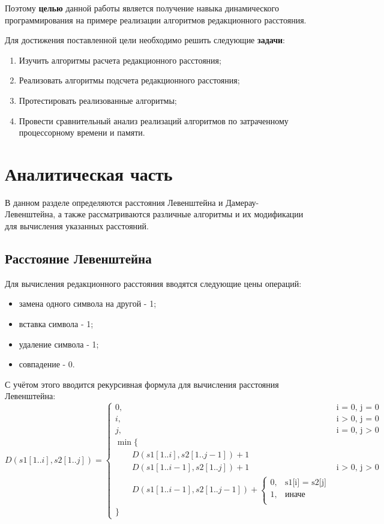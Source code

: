 \documentclass{report}
\begin{document}
Поэтому \textbf{целью} данной работы является получение навыка динамического программирования на примере реализации алгоритмов редакционного расстояния. 

Для достижения поставленной цели необходимо решить следующие \textbf{задачи}:
\begin{enumerate}
\item Изучить алгоритмы расчета редакционного расстояния;
\item Реализовать алгоритмы подсчета редакционного расстояния;
\item Протестировать реализованные алгоритмы;
\item Провести сравнительный анализ реализаций алгоритмов по затраченному процессорному времени и памяти.
\end{enumerate}


\chapter{Аналитическая часть}
В данном разделе определяются расстояния Левенштейна и Дамерау-Левенштейна, а также рассматриваются различные алгоритмы и их модификации для вычисления указанных расстояний.

\section{Расстояние Левенштейна}

Для вычисления редакционного расстояния вводятся следующие цены операций:
\begin{itemize}
\item замена одного символа на другой - 1;
\item вставка символа - 1;
\item удаление символа - 1;
\item совпадение - 0.
\end{itemize}

С учётом этого вводится рекурсивная формула для вычисления расстояния Левенштейна:
\begin{equation}
\label{eq:LD}
D(s1[1..i], s2[1..j]) = 
\begin{cases}
0, &\text{i = 0, j = 0}\\
i, &\text{i > 0, j = 0}\\
j, &\text{i = 0, j >  0}\\
\min \lbrace \\
\qquad D(s1[1..i], s2[1..j-1]) + 1\\
\qquad D(s1[1..i-1], s2[1..j]) + 1 &\text{i > 0, j > 0}\\
\qquad D(s1[1..i-1], s2[1..j-1]) + 
\begin{cases} 
0, &\text{s1[i] = s2[j]}\\
1, &\text{иначе}\\ 
\end{cases}\\
\rbrace
\end{cases}
\end{equation}
\end{document}
